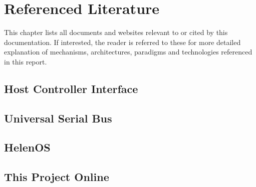 \chapter{Referenced Literature}

This chapter lists all documents and websites relevant to or cited by this
documentation. If interested, the reader is referred to these for more detailed
explanation of mechanisms, architectures, paradigms and technologies referenced
in this report.


\section{Host Controller Interface}



\section{Universal Serial Bus}



\section{HelenOS}



\section{This Project Online}



